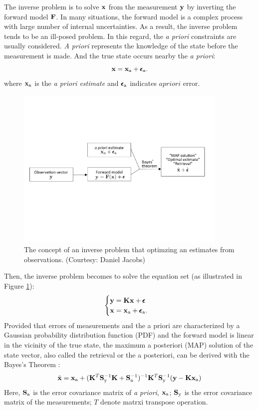 The inverse problem is to solve $\mathbf{x}$ from the measurement $\mathbf{y}$ by
inverting the forward model $\mathbf{F}$. In many situations, the forward
model is a complex process with large number of internal uncertainties.
As a result, the inverse problem tends to be an ill-posed problem. In
this regard, the \textit{a priori} constraints are usually considered.
\textit{A priori} represents the knowledge of the state before the
measurement is made. And the true state occurs nearby the \textit{a
priori}:
\begin{equation}
\mathbf{x} = \mathbf{x}_\text{a} + \pmb{\epsilon}_\text{a}. \label{eq:ap}
\end{equation}
where $\mathbf{x}_\text{a}$ is the \textit{a priori estimate} and $\pmb{\epsilon}_\text{a}$
indicates $a priori$ error.

\begin{figure}[t]
  \centering
  \includegraphics[width={0.9\textwidth}]{figures/MAP.pdf}
  \caption{The concept of an inverse problem that optimzing an estimates
from observations. (Courtesy: Daniel Jacobs)}
  \label{fig:map}
\end{figure}

Then, the inverse problem becomes to solve the equation set (as
illustrated in Figure \ref{fig:map}):
\begin{equation}
\begin{cases}
\mathbf{y} = \mathbf{K}\mathbf{x} + \pmb{\epsilon} \\
\mathbf{x} = \mathbf{x}_\text{a} + \pmb{\epsilon}_\text{a}.
\end{cases}
\label{eq:inverse2}
\end{equation}
Provided that errors of measurements and the a priori are characterized
by a Gaussian probability distribution function (PDF) and the forward
model is linear in the vicinity of the true state, the maximum
a posteriori (MAP) solution of the state vector, also called the retrieval or
the a posteriori, can be derived with the Bayes's Theorem
\citep{Rodgers00}:
\begin{equation}
\hat{\mathbf{x}} = \mathbf{x}_\text{a} + (\mathbf{K}^T\mathbf{S}_\text{y}^{-1}\mathbf{K}+\mathbf{S}_\text{a}^{-1})^{-1}
\mathbf{K}^T\mathbf{S}_\text{y}^{-1}(\mathbf{y}-\mathbf{K}\mathbf{x}_\text{a}) \label{eq:xhat}
\end{equation}
Here, $\mathbf{S}_\text{a}$ is the error covariance matrix of \textit{a priori},
$\mathbf{x}_\text{a}$; $\mathbf{S}_\text{y}$ is the error covariance matrix of the
measurements; $T$ denote matrxi transpose operation. 

